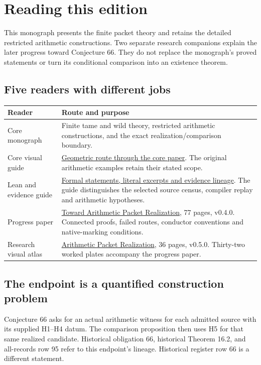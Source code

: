 \begingroup\raggedright
\section*{Reading this edition}
{}
This monograph presents the finite packet theory and retains the detailed restricted arithmetic constructions. Two separate research companions explain the later progress toward Conjecture 66. They do not replace the monograph's proved statements or turn its conditional comparison into an existence theorem.

\subsection*{Five readers with different jobs}
\begin{tabular}{@{}>{\raggedright\arraybackslash}p{.28\linewidth}>{\raggedright\arraybackslash}p{.67\linewidth}@{}}\toprule
Reader & Route and purpose\\\midrule
Core monograph & Finite tame and wild theory, restricted arithmetic constructions, and the exact realization/comparison boundary.\\[7pt]
Core visual guide & \href{https://komorebi.invalid/b07/core_visual}{Geometric route through the core paper}. The original arithmetic examples retain their stated scope.\\[7pt]
Lean and evidence guide & \href{https://komorebi.invalid/b07/core_lean}{Formal statements, literal excerpts and evidence lineage}. The guide distinguishes the selected source census, compiler replay and arithmetic hypotheses.\\[7pt]
Progress paper & \href{https://komorebi.invalid/b07/research_start}{Toward Arithmetic Packet Realization}, 77 pages, v0.4.0. Connected proofs, failed routes, conductor conventions and native-marking conditions.\\[7pt]
Research visual atlas & \href{https://komorebi.invalid/b07/atlas_start}{Arithmetic Packet Realization}, 36 pages, v0.5.0. Thirty-two worked plates accompany the progress paper.\\\bottomrule
\end{tabular}

\subsection*{The endpoint is a quantified construction problem}
Conjecture 66 asks for an actual arithmetic witness for each admitted source with its supplied H1--H4 datum. The comparison proposition then uses H5 for that same realized candidate. Historical obligation 66, historical Theorem 16.2, and all-records row 95 refer to this endpoint's lineage. Historical register row 66 is a different statement.


